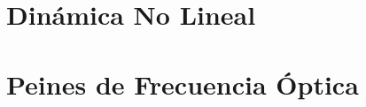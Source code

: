 	\section{Dinámica No Lineal}
		\label{Intr:NonLnr}
		
		

	\section{Peines de Frecuencia Óptica}
		\label{Intr:OFC}
		
		

		
